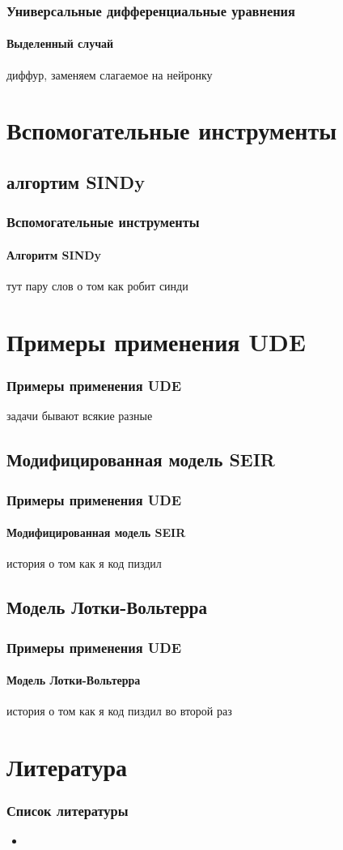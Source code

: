 \documentclass[10pt,pdf,hyperref={unicode}]{beamer}
\begin{document}
		\begin{frame}
			\frametitle{Универсальные дифференциальные уравнения} 
			\framesubtitle{Выделенный случай}
				диффур, заменяем слагаемое на нейронку 
		\end{frame}
	
	
	\section{Вспомогательные инструменты}
	
		\subsection{алгортим SINDy}
		
			\begin{frame}
				\frametitle{Вспомогательные инструменты} 
				\framesubtitle{Алгоритм SINDy}
					тут пару слов о том как робит синди  
			\end{frame}
		
		
	\section{Примеры применения UDE}
	
		\begin{frame}
			\frametitle{Примеры применения UDE} 
				задачи бывают всякие разные  
		\end{frame}
	
		
		\subsection{Модифицированная модель SEIR}
		
			\begin{frame}
				\frametitle{Примеры применения UDE} 
				\framesubtitle{Модифицированная модель SEIR}
					история о том как я код пиздил  
			\end{frame}
			
			
		\subsection{Модель Лотки-Вольтерра}
			
			\begin{frame}
				\frametitle{Примеры применения UDE} 
				\framesubtitle{Модель Лотки-Вольтерра}
					история о том как я код пиздил  во второй раз
			\end{frame}
		
		
	\section*{Литература}
	
		\begin{frame}
			\frametitle{Список литературы} 
				\begin{itemize}
					\item
				\end{itemize}
			
		\end{frame}
\end{document}
